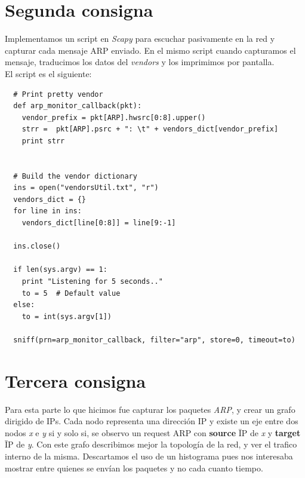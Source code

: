 \documentclass[a4paper]{article}
\begin{document}
\section{Segunda consigna}

Implementamos un script en \textit{Scapy} para escuchar pasivamente en la red y capturar cada mensaje ARP enviado. En el mismo script cuando capturamos el mensaje, traducimos los datos del \textit{vendors} y los imprimimos por pantalla.\\

El script es el siguiente:

\begin{verbatim}
  # Print pretty vendor
  def arp_monitor_callback(pkt):
    vendor_prefix = pkt[ARP].hwsrc[0:8].upper()
    strr =  pkt[ARP].psrc + ": \t" + vendors_dict[vendor_prefix]
    print strr


  # Build the vendor dictionary
  ins = open("vendorsUtil.txt", "r")
  vendors_dict = {}
  for line in ins:
    vendors_dict[line[0:8]] = line[9:-1] 
   
  ins.close()
	
  if len(sys.argv) == 1:
    print "Listening for 5 seconds.."
    to = 5  # Default value
  else:
    to = int(sys.argv[1]) 

  sniff(prn=arp_monitor_callback, filter="arp", store=0, timeout=to)	
\end{verbatim}

\newpage

\section{Tercera consigna}

Para esta parte lo que hicimos fue capturar los paquetes \textit{ARP}, y crear un grafo dirigido de IPs. Cada nodo representa una dirección IP y existe un eje entre dos nodos \textit{x} e \textit{y} si y solo si, se observo un request ARP con \textbf{source} \= IP de \textit{x} y \textbf{target} \= IP de \textit{y}. 
 Con este grafo describimos mejor la topología de la red, y ver el trafico interno de la misma. Descartamos el uso de un histograma pues nos interesaba mostrar entre quienes se envían los paquetes y no cada cuanto tiempo. \\
\end{document}
